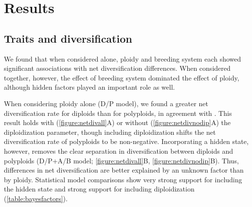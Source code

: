 \section{Results}

\subsection{Traits and diversification}


We found that when considered alone, ploidy and breeding system each showed significant associations with net diversification differences. %
When considered together, however, the effect of breeding system dominated the effect of ploidy, although hidden factors played an important role as well. %

When considering ploidy alone (D/P model), we found a greater net diversification rate for diploids than for polyploids, in agreement with \citep{mayrose_2011, mayrose_2015}.
This result holds with (\cref{figure:netdivall}A) or without (\cref{figure:netdivnodip}A) the diploidization parameter, though including diploidization shifts the net diversification rate of polyploids to be non-negative.
Incorporating a hidden state, however, removes the clear separation in diversification between diploids and polyploids (D/P+A/B model; \cref{figure:netdivall}B, \cref{figure:netdivnodip}B).
Thus, differences in net diversification are better explained by an unknown factor than by ploidy.
Statistical model comparisons show very strong support for including the hidden state and strong support for including diploidization (\cref{table:bayesfactors}).

